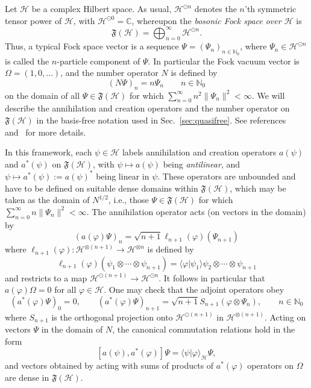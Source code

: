 \documentclass[12pt]{article}
\newcommand{\1}{\mathds{1}}                         %
\newcommand{\NN}{\mathbb{N}}          %
\newcommand{\CC}{\mathbb{C}}           %
\newcommand{\FF}{{\mathfrak{F}}}
\newcommand{\HH}{{\mathcal{H}}}
\newcommand{\ip}[2]{\langle #1|#2\rangle}
\begin{document}
Let $\HH$ be a complex Hilbert space. As usual, $\HH^{\odot n}$ denotes the $n$'th symmetric tensor power of $\HH$, with $\HH^{\odot 0}=\CC$, whereupon the \emph{bosonic Fock space over $\HH$} is
\[
\FF(\HH) = \bigoplus_{n=0}^\infty \HH^{\odot n}.
\]
Thus, a typical Fock space vector is a sequence $\Psi = (\Psi_n)_{n\in\NN_0}$, where
$\Psi_n\in\HH^{\odot n}$ is called the $n$-particle component of $\Psi$. 
In particular the Fock vacuum vector is $\Omega=(1,0,\ldots)$, and the number operator
$N$ is defined by 
\[
(N\Psi)_n = n\Psi_n \qquad n\in\NN_0
\]
on the domain of all $\Psi\in\FF(\HH)$ for which $\sum_{n=0}^\infty n^2\|\Psi_n\|^2<\infty$.
We will describe the annihilation and creation operators and the number operator on $\FF(\HH)$ in the basis-free notation used in Sec.~\ref{sec:quasifree}. 
See references~\cite[\S 5.2.1]{BratRob:vol2} and~\cite[\S X.7]{ReedSimon:vol2} for more details.

In this framework, each $\psi\in\HH$ labels annihilation and creation operators $a(\psi)$ and $a^*(\psi)$ on $\FF(\HH)$, with $\psi\mapsto a(\psi)$ being \emph{antilinear}, and $\psi\mapsto a^*(\psi):=a(\psi)^*$ being linear in $\psi$. These operators are unbounded and have to be defined on suitable dense domains within $\FF(\HH)$, which may be taken as the domain of $N^{1/2}$, i.e., those $\Psi\in\FF(\HH)$ for which $\sum_{n=0}^\infty n\|\Psi_n\|^2<\infty$. The annihilation operator acts (on vectors in the domain) by
\[
(a(\varphi)\Psi)_n = \sqrt{n+1} \ell_{n+1}(\varphi)(\Psi_{n+1})
\]
where $\ell_{n+1}(\varphi):\HH^{\otimes (n+1)}\to\HH^{\otimes n}$ is defined by 
\[
\ell_{n+1}(\varphi)(\psi_1\otimes\cdots\otimes\psi_{n+1}) = \ip{\varphi}{\psi_1}\psi_2\otimes\cdots\otimes \psi_{n+1}
\]
and restricts to a map $\HH^{\odot (n+1)}\to\HH^{\odot n}$. It follows in particular that $a(\varphi)\Omega=0$ for all $\varphi\in\HH$. One may check that the adjoint operators obey
\[
(a^*(\varphi)\Psi)_0=0,\qquad
(a^*(\varphi)\Psi)_{n+1} = \sqrt{n+1} S_{n+1} (\varphi\otimes\Psi_{n}),\qquad n\in\NN_0
\]
where $S_{n+1}$ is the orthogonal projection onto $\HH^{\odot (n+1)}$ in $\HH^{\otimes (n+1)}$. 
Acting on vectors $\Psi$ in the domain of $N$, the canonical commutation relations hold in the form
\begin{equation}\label{eq:CCRsappx}
[a(\psi),a^*(\varphi)]\Psi = \ip{\psi}{\varphi}_\HH \Psi,
\end{equation}
and vectors obtained by acting with sums of products of $a^*(\varphi)$ operators on $\Omega$ are dense in $\FF(\HH)$.
\end{document}
